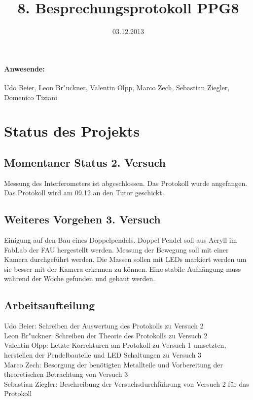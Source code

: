 \documentclass[
]{scrartcl}
\begin{document}
\title{8. Besprechungsprotokoll PPG8}
\date{03.12.2013}
\maketitle

\paragraph{Anwesende:}
Udo Beier, Leon Br"uckner, Valentin Olpp, Marco Zech, Sebastian Ziegler, Domenico Tiziani


\section{Status des Projekts}

\subsection{Momentaner Status 2. Versuch}
Messung des Interferometers ist abgeschlossen. Das Protokoll wurde angefangen. Das Protokoll wird am 09.12 an den Tutor geschickt.

\subsection{Weiteres Vorgehen 3. Versuch}
Einigung auf den Bau eines Doppelpendels. Doppel Pendel soll aus Acryll im FabLab der FAU hergestellt werden. Messung der Bewegung soll mit einer Kamera durchgeführt werden. Die Massen sollen mit LEDs markiert werden um sie besser mit der Kamera erkennen zu können. Eine stabile Aufhängung muss während der Woche gefunden und gebaut werden.

\subsection{Arbeitsaufteilung}
Udo Beier: Schreiben der Auswertung des Protokolls zu Versuch 2
\\
Leon Br"uckner: Schreiben der Theorie des Protokolls zu Versuch 2
\\
Valentin Olpp: Letzte Korrekturen am Protokoll zu Versuch 1 umsetzten, herstellen der Pendelbauteile und LED Schaltungen zu Versuch 3
\\
Marco Zech: Besorgung der benötigten Metallteile und Vorbereitung der theoretischen Betrachtung von Versuch 3
\\
Sebastian Ziegler: Beschreibung der Versuchsdurchführung von Versuch 2 für das Protokoll
\end{document}
